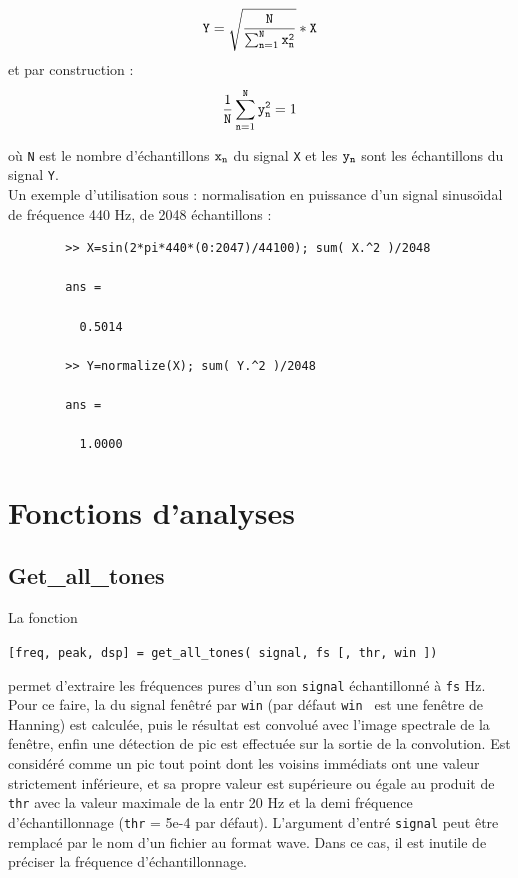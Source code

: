     $$ {\tt Y} = \sqrt{ \frac{\tt N}{\sum_{{\tt n}=1}^{\tt N}{\tt x_n^2 }} } * {\tt X} $$
    et par construction :
    $$ \frac{1}{\tt N} \sum_{{\tt n}=1}^{\tt N}{\tt y_n^2} = 1 $$

    o{\`u} {\tt N} est le nombre d'{\'e}chantillons ${\tt x_n}$ du signal
    {\tt X} et les ${\tt y_n}$ sont les {\'e}chantillons du signal
    {\tt Y}.\\

    Un exemple d'utilisation sous \matlab : normalisation en
    puissance d'un signal sinuso{\"\i}dal de fr{\'e}quence 440 Hz, de 2048
    {\'e}chantillons : \\

    \begin{verbatim}
        >> X=sin(2*pi*440*(0:2047)/44100); sum( X.^2 )/2048

        ans =

          0.5014

        >> Y=normalize(X); sum( Y.^2 )/2048

        ans =

          1.0000
    \end{verbatim}



\newpage
\section{Fonctions d'analyses}
\label{secanalyses}


    \bigskip
    \subsection{Get\_all\_tones}
    \label{getalltones}
    La fonction
    \begin{center}
    {\tt [freq, peak, dsp] = get\_all\_tones( signal, fs [, thr, win ])}
    \end{center}
    permet d'extraire les fr{\'e}quences pures d'un
    son {\tt signal} {\'e}chantillonn{\'e} {\`a} {\tt fs} Hz. Pour ce faire,
    la \dsp du signal fen{\^e}tr{\'e} par {\tt win} (par d{\'e}faut {\tt win } est
    une fen{\^e}tre de Hanning) est calcul{\'e}e, puis le r{\'e}sultat est convolu{\'e} avec l'image
    spectrale de la fen{\^e}tre, enfin une d{\'e}tection de pic est effectu{\'e}e
    sur la sortie de la convolution. Est consid{\'e}r{\'e} comme un pic tout
    point dont les voisins imm{\'e}diats ont une valeur strictement
    inf{\'e}rieure, et sa propre valeur est sup{\'e}rieure ou {\'e}gale au produit
    de {\tt thr} avec la valeur maximale de la \dsp entr 20 Hz et la
    demi fr{\'e}quence d'{\'e}chantillonnage ({\tt thr} = 5e-4 par d{\'e}faut).
    L'argument d'entr{\'e} {\tt signal} peut {\^e}tre remplac{\'e} par le nom d'un
    fichier au format wave. Dans ce cas, il est inutile de pr{\'e}ciser la
    fr{\'e}quence d'{\'e}chantillonnage.\\

